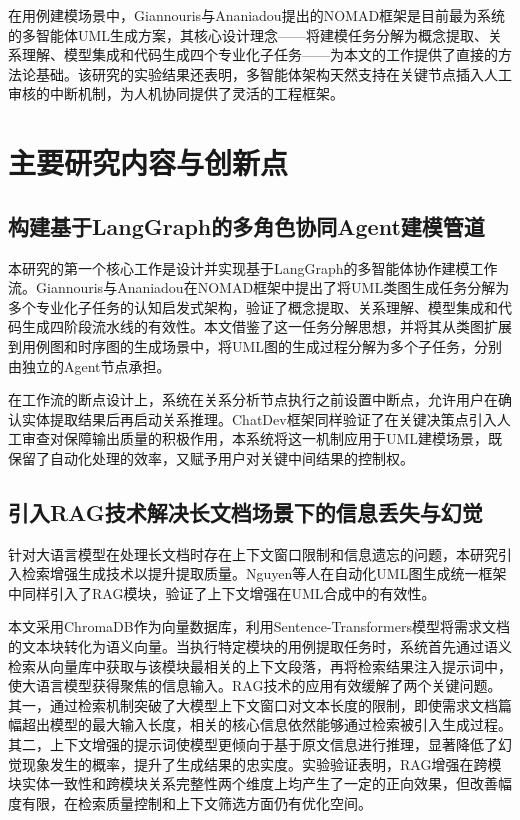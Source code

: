 在用例建模场景中，Giannouris与Ananiadou\cite{giannouris2025nomad}提出的NOMAD框架是目前最为系统的多智能体UML生成方案，其核心设计理念——将建模任务分解为概念提取、关系理解、模型集成和代码生成四个专业化子任务——为本文的工作提供了直接的方法论基础。该研究的实验结果还表明，多智能体架构天然支持在关键节点插入人工审核的中断机制，为人机协同提供了灵活的工程框架。

\section{主要研究内容与创新点}

\subsection{构建基于LangGraph的多角色协同Agent建模管道}

本研究的第一个核心工作是设计并实现基于LangGraph的多智能体协作建模工作流。Giannouris与Ananiadou\cite{giannouris2025nomad}在NOMAD框架中提出了将UML类图生成任务分解为多个专业化子任务的认知启发式架构，验证了概念提取、关系理解、模型集成和代码生成四阶段流水线的有效性。本文借鉴了这一任务分解思想，并将其从类图扩展到用例图和时序图的生成场景中，将UML图的生成过程分解为多个子任务，分别由独立的Agent节点承担。

在工作流的断点设计上，系统在关系分析节点执行之前设置中断点，允许用户在确认实体提取结果后再启动关系推理。ChatDev框架\cite{qian2023chatdev}同样验证了在关键决策点引入人工审查对保障输出质量的积极作用，本系统将这一机制应用于UML建模场景，既保留了自动化处理的效率，又赋予用户对关键中间结果的控制权。

\subsection{引入RAG技术解决长文档场景下的信息丢失与幻觉}

针对大语言模型在处理长文档时存在上下文窗口限制和信息遗忘的问题，本研究引入检索增强生成技术以提升提取质量。Nguyen等人\cite{nguyen2026novel}在自动化UML图生成统一框架中同样引入了RAG模块，验证了上下文增强在UML合成中的有效性。

本文采用ChromaDB作为向量数据库，利用Sentence-Transformers模型将需求文档的文本块转化为语义向量。当执行特定模块的用例提取任务时，系统首先通过语义检索从向量库中获取与该模块最相关的上下文段落，再将检索结果注入提示词中，使大语言模型获得聚焦的信息输入。RAG技术的应用有效缓解了两个关键问题。其一，通过检索机制突破了大模型上下文窗口对文本长度的限制，即使需求文档篇幅超出模型的最大输入长度，相关的核心信息依然能够通过检索被引入生成过程。其二，上下文增强的提示词使模型更倾向于基于原文信息进行推理，显著降低了幻觉现象发生的概率，提升了生成结果的忠实度。实验验证表明，RAG增强在跨模块实体一致性和跨模块关系完整性两个维度上均产生了一定的正向效果，但改善幅度有限，在检索质量控制和上下文筛选方面仍有优化空间。

